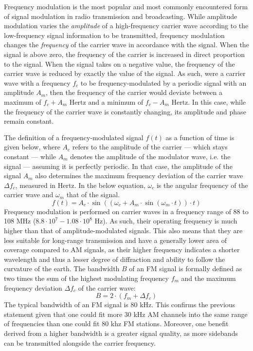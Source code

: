 
Frequency modulation is the most popular and most commonly encountered form of signal modulation in radio transmission and broadcasting. While amplitude modulation varies the \emph{amplitude} of a high-frequency carrier wave according to the low-frequency signal information to be transmitted, frequency modulation changes the \emph{frequency} of the carrier wave in accordance with the signal. When the signal is above zero, the frequency of the carrier is increased in direct proportion to the signal. When the signal takes on a negative value, the frequency of the carrier wave is reduced by exactly the value of the signal. As such, were a carrier wave with a frequency $f_c$ to be frequency-modulated by a periodic signal with an amplitude $A_m$, then the frequency of the carrier would deviate between a maximum of $f_c + A_m$ Hertz and a minimum of $f_c - A_m$ Hertz. In this case, while the frequency of the carrier wave is constantly changing, its amplitude and phase remain constant.

The definition of a frequency-modulated signal $f(t)$ as a function of time is given below, where $A_c$ refers to the amplitude of the carrier --- which stays constant --- while $A_m$ denotes the amplitude of the modulator wave, i.e. the signal --- assuming it is perfectly periodic. In that case, the amplitude of the signal $A_m$ also determines the maximum frequency deviation of the carrier wave $\Delta f_c$, measured in Hertz. In the below equation, $\omega_c$ is the angular frequency of the carrier wave and $\omega_m$ that of the signal. $$f(t) = A_c \cdot \sin((\omega_c + A_m \cdot \sin(\omega_m \cdot t))\cdot t)$$ Frequency modulation is performed on carrier waves in a frequency range of 88 to 108 MHz ($8.8 \cdot 10^7 - 1.08 \cdot 10^8$ Hz). As such, their operating frequency is much higher than that of amplitude-modulated signals. This also means that they are less suitable for long-range transmission and have a generally lower area of coverage compared to AM signals, as their higher frequency indicates a shorter wavelength and thus a lesser degree of diffraction and ability to follow the curvature of the earth. The bandwidth $B$ of an FM signal is formally defined as two times the sum of the highest modulating frequency $f_m$ and the maximum frequency deviation $\Delta f_c$ of the carrier wave: $$B = 2 \cdot (f_m + \Delta f_c)$$ The typical bandwidth of an FM signal is 80 kHz. This confirms the previous statement given that one could fit more 30 kHz AM channels into the same range of frequencies than one could fit 80 khz FM stations. Moreover, one benefit derived from a higher bandwidth is a greater signal quality, as more sidebands can be transmitted alongside the carrier frequency. 

